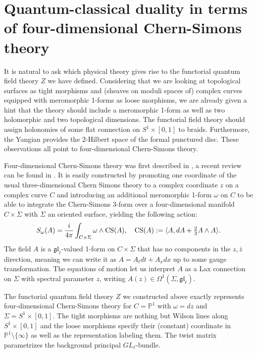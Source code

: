 \documentclass[11pt]{report}
\theoremstyle{definition}
\theoremstyle{remark}
\theoremstyle{remark}
\renewcommand{\P}{\mathbb{P}}
\begin{document}
\section{Quantum-classical duality in terms of four-dimensional Chern-Simons theory}

It is natural to ask which physical theory gives rise to the functorial quantum field theory $Z$ we have defined. Considering that we are looking at topological surfaces as tight morphisms and (sheaves on moduli spaces of) complex curves equipped with meromorphic 1-forms as loose morphisms, we are already given a hint that the theory should include a meromorphic 1-form as well as two holomorphic and two topological dimensions. The functorial field theory should assign holonomies of some flat connection on $S^1 \times [0,1]$ to braids. Furthermore, the Yangian provides the 2-Hilbert space of the formal punctured disc. These observations all point to four-dimensional Chern-Simons theory.

Four-dimensional Chern-Simons theory was first described in \cite{article:costello:2013}, a recent review can be found in \cite{article:lacroix:2022}. It is easily constructed by promoting one coordinate of the usual three-dimensional Chern Simons theory to a complex coordinate $z$ on a complex curve $C$ and introducing an additional meromorphic 1-form $\omega$ on $C$ to be able to integrate the Chern-Simons 3-form over a four-dimensional manifold $C \times \Sigma$ with $\Sigma$ an oriented surface, yielding the following action:
\begin{equation*}
S_\omega(A) = \frac{i}{4\pi} \int_{C \times \Sigma} \omega \wedge \textnormal{CS}(A), \quad \textnormal{CS}(A) := \langle A, dA + \tfrac 23 A \wedge A \rangle.
\end{equation*}
The field $A$ is a $\mathfrak{gl}_\ell$-valued 1-form on $C \times \Sigma$ that has no components in the $z,\bar z$ direction, meaning we can write it as $A = A_t dt + A_x dx$ up to some gauge transformation. The equations of motion let us interpret $A$ as a Lax connection on $\Sigma$ with spectral parameter $z$, writing $A(z) \in \Omega^1(\Sigma,\mathfrak{gl}_\ell)$.

The functorial quantum field theory $Z$ we constructed above exactly represents four-dimen\-sional Chern-Simons theory for $C=\P^1$ with $\omega = dz$ and $\Sigma = S^1 \times [0,1]$. The tight morphisms are nothing but Wilson lines along $S^1 \times [0,1]$ and the loose morphisms specify their (constant) coordinate in $\P^1 \setminus \{ \infty \}$ as well as the representation labeling them. The twist matrix parametrizes the background principal $GL_\ell$-bundle.
\end{document}
